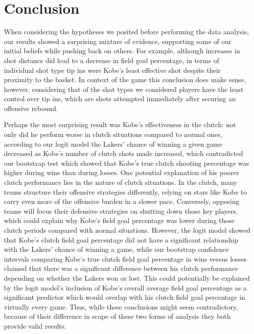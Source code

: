 \documentclass[paper=a4, fontsize=11pt]{scrartcl} %
\numberwithin{equation}{section} %
\numberwithin{figure}{section} %
\numberwithin{table}{section} %
\begin{document}
\section{Conclusion}
\hspace*{1cm}When considering the hypotheses we posited before performing the data analysis, our results showed a surprising mixture of evidence, supporting some of our initial beliefs while pushing back on others. For example, although increases in shot distance did lead to a decrease in field goal percentage, in terms of individual shot type tip ins were Kobe's least effective shot despite their proximity to the basket. In context of the game this conclusion does make sense, however, considering that of the shot types we considered players have the least control over tip ins, which are shots attempted immediately after securing an offensive rebound. 

\hspace*{1cm}Perhaps the most surprising result was Kobe's effectiveness in the clutch: not only did he perform worse in clutch situations compared to normal ones, according to our logit model the Lakers' chance of winning a given game decreased as Kobe's number of clutch shots made increased, which contradicted our bootstrap test which showed that Kobe's true clutch shooting percentage was higher during wins than during losses. One potential explanation of his poorer clutch performance lies in the nature of clutch situations. In the clutch, many teams structure their offensive strategies differently, relying on stars like Kobe to carry even more of the offensive burden in a slower pace. Conversely, opposing teams will focus their defensive strategies on shutting down those key players, which could explain why Kobe's field goal percentage was lower during those clutch periods compared with normal situations. However, the logit model showed that Kobe's clutch field goal percentage did not have a significant relationship with the Lakers' chance of winning a game, while our bootstrap confidence intervals comparing Kobe's true clutch field goal percentage in wins versus losses claimed that there was a significant difference between his clutch performance depending on whether the Lakers won or lost. This could potentially be explained by the logit model's inclusion of Kobe's overall average field goal percentage as a significant predictor which would overlap with his clutch field goal percentage in virtually every game. Thus, while these conclusions might seem contradictory, because of their difference in scope of these two forms of analysis they both provide valid results. 
\end{document}
